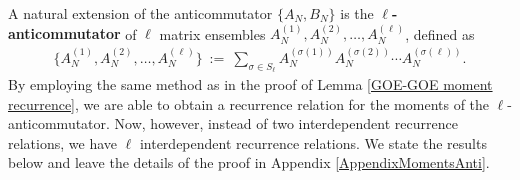 \documentclass[11pt,reqno]{amsart}
\numberwithin{equation}{section}
\theoremstyle{plain}
\newtheorem{definition}[thm]{Definition}
\newtheorem{theorem}[thm]{Theorem}
\begin{document}
A natural extension of the anticommutator $\{A_N,B_N\}$ is the \textbf{$\ell$- anticommutator} of $\ell$ matrix ensembles $A^{(1)}_N,A^{(2)}_{N},\dotsc, A^{(\ell)}_{N}$, defined as
\begin{align}
\{A^{(1)}_N, A^{(2)}_N, \dotsc, A^{(\ell)}_N\} \ := \ \sum_{\sigma\in S_\ell} A^{(\sigma(1))}_N A^{(\sigma(2))}_N \cdots A^{(\sigma(\ell))}_N.
\end{align}
By employing the same method as in the proof of Lemma \ref{GOE-GOE moment recurrence}, we are able to obtain a recurrence relation for the moments of the $\ell$-anticommutator. Now, however, instead of two interdependent recurrence relations, we have $\ell$ interdependent recurrence relations. We state the results below and leave the details of the proof in Appendix
\ref{AppendixMomentsAnti}.

\end{document}

